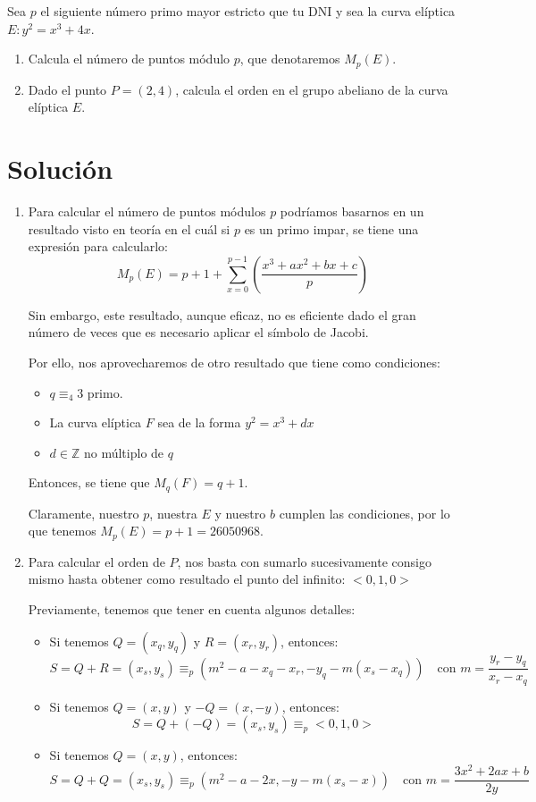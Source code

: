 	Sea $p$ el siguiente número primo mayor estricto que tu DNI y sea la curva elíptica $E: y^2 = x^3 + 4x$.
	\begin{enumerate}
		\item Calcula el número de puntos módulo $p$, que denotaremos $M_p(E)$.
		\item Dado el punto $P = (2,4)$, calcula el orden en el grupo abeliano de la curva elíptica $E$.
	\end{enumerate}
	
\section*{Solución}
	\begin{enumerate}
		\item Para calcular el número de puntos módulos $p$ podríamos basarnos en un resultado visto en teoría
		en el cuál si $p$ es un primo impar, se tiene una expresión para calcularlo:
		$$\displaystyle M_p(E) = p + 1 + \sum_{x=0}^{p-1} \left( \frac{x^3 + ax^2 + bx + c}{p} \right)$$
		
		Sin embargo, este resultado, aunque eficaz, no es eficiente dado el gran número de veces que es necesario
		aplicar el símbolo de Jacobi.
		
		Por ello, nos aprovecharemos de otro resultado que tiene como condiciones:
		\begin{itemize}
			\item $q \equiv_4 3$ primo.
			\item La curva elíptica $F$ sea de la forma $y^2 = x^3 + dx$
			\item $d \in \mathbb{Z}$ no múltiplo de $q$
		\end{itemize}
		Entonces, se tiene que $M_q(F) = q+1$.

		Claramente, nuestro $p$, nuestra $E$ y nuestro $b$ cumplen las condiciones, por lo que tenemos $M_p(E)
		= p+1 = 26050968$.
		
		\item Para calcular el orden de $P$, nos basta con sumarlo sucesivamente consigo mismo hasta obtener
		como resultado el punto del infinito: $<0, 1, 0>$
		
		Previamente, tenemos que tener en cuenta algunos detalles:
		\begin{itemize}
			\item Si tenemos $Q = (x_q, y_q)$ y $R = (x_r, y_r)$, entonces:
			$$S = Q + R = (x_s, y_s) \equiv_p (m^2 - a - x_q - x_r, -y_q - m(x_s - x_q)) \quad \text{con }
			m=\frac{y_r - y_q}{x_r - x_q}$$
			\item Si tenemos $Q = (x, y)$ y $-Q = (x, -y)$, entonces:
			$$S = Q + (-Q) = (x_s, y_s) \equiv_p <0, 1, 0>$$
			\item Si tenemos $Q = (x, y)$, entonces:
			$$S = Q + Q = (x_s, y_s) \equiv_p (m^2 - a - 2x, -y - m(x_s - x)) \quad \text{con }
			m=\frac{3x^2 + 2ax + b}{2y}$$
		\end{itemize}
	\end{enumerate}